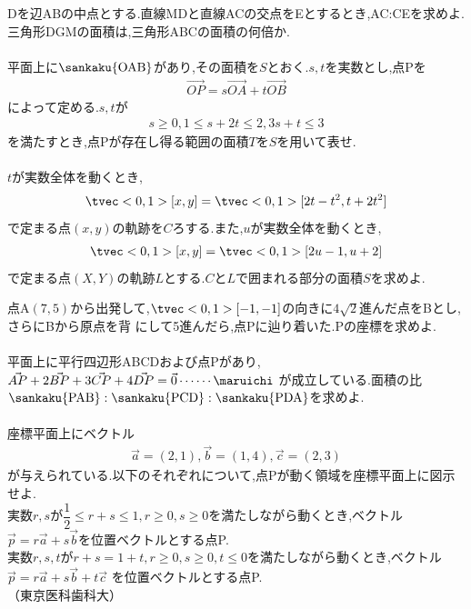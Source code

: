 \documentclass[10pt,fleqn,a4paper]{jsarticle}
\newcommand{\ans}[1]{\mbox{\boldmath{$#1$}}}
\begin{document}
\kakkoni Dを辺ABの中点とする.直線MDと直線ACの交点をEとするとき,AC:CEを求めよ.\\
\kakkosan 三角形DGMの面積は,三角形ABCの面積の何倍か.\\
\\
平面上に$\sankaku{\mathrm{OAB}}$があり,その面積を$S$とおく.$s,t$を実数とし,点Pを
\begin{align*}
    \Vec{OP}=s\Vec{OA}+t\Vec{OB}
\end{align*}
によって定める.$s,t$が
\begin{align*}
    s\geq0,1\leq s+2t\leq 2,3s+t\leq3
\end{align*}
を満たすとき,点Pが存在し得る範囲の面積$T$を$S$を用いて表せ.\\
\\
$t$が実数全体を動くとき,
\begin{align*}
    \tvec<0,1>[x,y]=\tvec<0,1>[2t-t^2,t+2t^2]
\end{align*}
で定まる点$(x,y)$の軌跡を$C$ろする.また,$u$が実数全体を動くとき,
\begin{align*}
    \tvec<0,1>[x,y]=\tvec<0,1>[2u-1,u+2]
\end{align*}
で定まる点$(X,Y)$の軌跡$L$とする.$CとLで囲まれる部分の面積Sを求めよ.$
\newpage
\begin{center}
    \ans{1章の問題演習}
\end{center}
\noindent\reibanichi 点A$(7,5)$から出発して,$\tvec<0,1>[-1,-1]$の向きに$4\sqrt{2}$進んだ点をBとし,さらにBから原点を背
にして5進んだら,点Pに辿り着いた.Pの座標を求めよ.\\\\
\reibanni 平面上に平行四辺形ABCDおよび点Pがあり,$\Vec{AP}+2\Vec{BP}+3\Vec{CP}+4\Vec{DP}=\vec{0}\cdots\cdots\maruichi$
が成立している.面積の比$\sankaku{\mathrm{PAB}}:\sankaku{\mathrm{PCD}}:\sankaku{\mathrm{PDA}}$を求めよ.\\\\
\reibansan 座標平面上にベクトル
\begin{align*}
    \vec{a}=(2,1),\vec{b}=(1,4),\vec{c}=(2,3)
\end{align*}
が与えられている.以下のそれぞれについて,点Pが動く領域を座標平面上に図示せよ.\\
\kakkoichi 実数$r,s$が$\dfrac{1}{2}\leq r+s\leq1,r\geq0,s\geq0$を満たしながら動くとき,ベクトル\\
$\vec{p}=r\vec{a}+s\vec{b}$を位置ベクトルとする点P.\\
\kakkoni 実数$r,s,tがr+s=1+t,r\geq0,s\geq0,t\leq0$を満たしながら動くとき,ベクトル$\vec{p}=r\vec{a}+s\vec{b}+t\vec{c}$
を位置ベクトルとする点P.\\
\hspace{10cm}（東京医科歯科大）
\newpage
\end{document}
